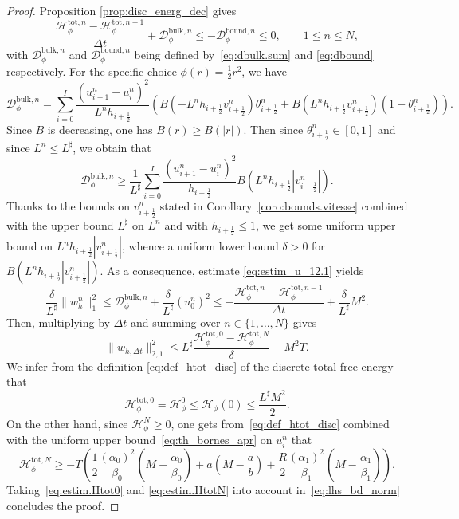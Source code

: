 \documentclass{amsart}
\newcommand\dt{\Delta t}
\newcommand\h[1]{h_{#1 \frac{1}{2}}}
\renewcommand\v[2]{v_{#1 \frac{1}{2}}^{#2}}
\newcommand\Bern[3]{B\left(#3 L^n \h{#1}{} \v{#1}{#2}\right)}
\renewcommand\H{\mathcal{H}_{\phi}}
\begin{document}
	\begin{proof}
		Proposition \ref{prop:disc_energ_dec} gives
		\begin{equation}\label{eq:estim_u_12.1}
			\frac{\H^{\text{tot}, n} - \H^{\text{tot}, n-1}}{\dt} + \mathcal{D}_\phi^{\text{bulk},n} \leq - \mathcal{D}_\phi^{\text{bound},n} \leq 0, \qquad 1 \leq n \leq N,
		\end{equation}
		with \(\mathcal{D}_\phi^{\text{bulk},n}\) and \(\mathcal{D}_\phi^{\text{bound},n}\) being defined by~\eqref{eq:dbulk.sum} and \eqref{eq:dbound} 
		respectively. For the specific choice $\phi(r) = \frac12r^2$, we have 
		\[
		\mathcal{D}_\phi^{\text{bulk},n} \!=\! \sum_{i=0}^I \frac{(u_{i+1}^n - u_i^n)^2}{L^n \h{i+}}\!
		\left(\Bern{i+}{n}{-} \theta_{i+\frac{1}{2}}^n + \Bern{i+}{n}{}(1 - \theta_{i+\frac{1}{2}}^n) \right).
		\]
		Since $B$ is decreasing, one has $B(r) \geq B(|r|)$. Then since $\theta_{i+\frac12}^n \in [0,1]$ and since $L^n \leq L^\sharp$, 
		we obtain that 
		\[
		\mathcal{D}_\phi^{\text{bulk},n} \geq \frac1{L^\sharp}\sum_{i=0}^I \frac{(u_{i+1}^n - u_i^n)^2}{\h{i+}} B\left(L^n \h{i+} |v_{i+\frac12}^n|\right). 
		\]
		Thanks to the bounds on $v_{i+\frac12}^n$ stated in Corollary~\ref{coro:bounds.vitesse} 
		combined with the upper bound $L^\sharp$ on $L^n$ and with $\h{i+}\leq 1$, we get some uniform upper bound on $L^n \h{i+} |v_{i+\frac12}^n|$, 
		whence a uniform lower bound $\delta >0$ for $B\left(L^n \h{i+} |v_{i+\frac12}^n|\right)$. 
		As a consequence, estimate \eqref{eq:estim_u_12.1} yields
		\[
		 \frac\delta{L^\sharp} \|w_h^n\|^2_1 \leq \mathcal{D}_\phi^{\text{bulk},n} +  \frac\delta{L^\sharp} (u_0^n)^2\leq - \frac{\H^{\text{tot}, n} - \H^{\text{tot}, n-1}}{\dt}
		 + \frac\delta{L^\sharp} M^2.
		\]
		Then, multiplying by $\dt$ and summing over $n \in \{1,\dots, N\}$ gives
		\begin{equation} \label{eq:lhs_bd_norm}
		\|w_{h,\dt}\|_{2,1}^2  \leq  L^\sharp \frac{\mathcal{H}_\phi^{\text{tot},0} - \mathcal{H}_\phi^{\text{tot},N}}\delta +    M^2 T.
		\end{equation}
		We infer from the definition \eqref{eq:def_htot_disc} of the discrete total free energy that 
		\begin{equation}\label{eq:estim.Htot0}
		{\mathcal H}_\phi^{\text{tot},0} = {\mathcal H}_\phi^{0} \leq  {\mathcal H}_\phi(0) \leq \frac{L^\sharp M^2}2.
		\end{equation}
		On the other hand, since  $\mathcal{H}_\phi^{N} \geq 0$, one gets from~\eqref{eq:def_htot_disc} combined with the uniform upper 
		bound~\eqref{eq:th_bornes_apr} on $u_i^n$ that 
		\begin{equation}\label{eq:estim.HtotN}
		\mathcal{H}_\phi^{\text{tot},N} \geq - T \left( 
		\frac12 \frac{(\alpha_0)^2}{\beta_0}  \left(M-\frac{\alpha_0}{\beta_0} \right) 
			+ a \left(M-\frac{a}b \right) + \frac{R}2 \frac{(\alpha_1)^2}{\beta_1} \left(M-\frac{\alpha_1}{ \beta_1 }\right)\right).
		\end{equation}
		Taking~\eqref{eq:estim.Htot0} and \eqref{eq:estim.HtotN} into account in~\eqref{eq:lhs_bd_norm} concludes the proof.
	\end{proof}
\end{document}
